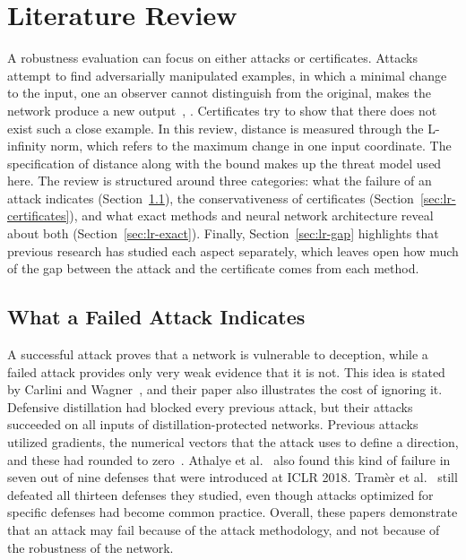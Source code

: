 \section{Literature Review}
\label{sec:literature-review}

A robustness evaluation can focus on either attacks or certificates. Attacks attempt to find
adversarially manipulated examples, in which a minimal change to the input, one an observer cannot
distinguish from the original, makes the network produce a new output~\cite{MapSource01},
\cite{MapSource02}. Certificates try to show that there does not exist such a close example. In this
review, distance is measured through the L-infinity norm, which refers to the maximum change in one
input coordinate. The specification of distance along with the bound makes up the threat model used
here. The review is structured around three categories: what the failure of an attack indicates
(Section~\ref{sec:lr-attacks}), the conservativeness of certificates
(Section~\ref{sec:lr-certificates}), and what exact methods and neural network
architecture reveal about both (Section~\ref{sec:lr-exact}). Finally,
Section~\ref{sec:lr-gap} highlights that previous research has studied each aspect
separately, which leaves open how much of the gap between the attack and the
certificate comes from each method.

\subsection{What a Failed Attack Indicates}
\label{sec:lr-attacks}

A successful attack proves that a network is vulnerable to deception, while a failed attack provides
only very weak evidence that it is not. This idea is stated by Carlini and
Wagner~\cite[Sec.~I]{MapSource03}, and their paper also illustrates the cost of ignoring it.
Defensive distillation had blocked every previous attack, but their attacks succeeded on all inputs
of distillation-protected networks. Previous attacks utilized gradients, the numerical vectors that
the attack uses to define a direction, and these had rounded to zero~\cite[Secs.~VIII-A,
VIII-B]{MapSource03}. Athalye et al.~\cite[Sec.~1, p.~1]{MapSource06} also found this kind of
failure in seven out of nine defenses that were introduced at ICLR 2018. Tram{\`e}r et
al.~\cite[Sec.~1, p.~3]{Tramer2020Adaptive} still defeated all thirteen defenses they studied, even
though attacks optimized for specific defenses had become common practice. Overall, these papers
demonstrate that an attack may fail because of the attack methodology, and not because of the
robustness of the network.

